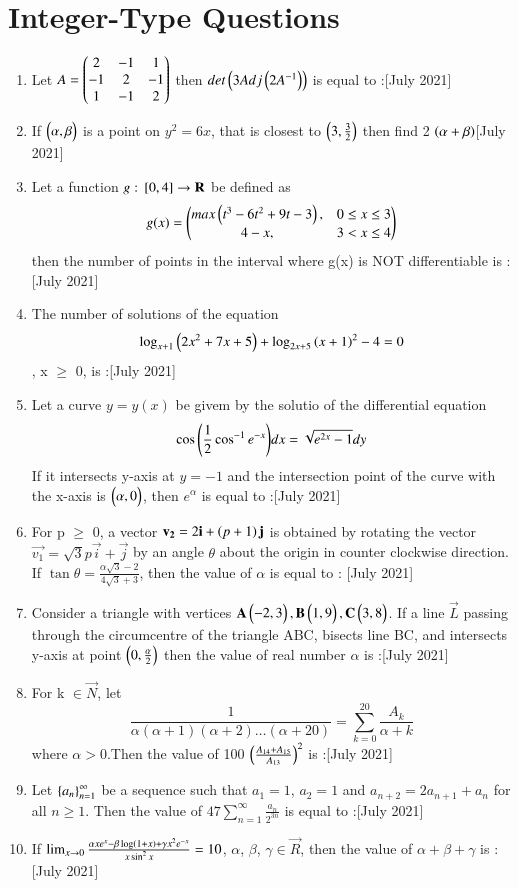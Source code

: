 \documentclass[journal,12pt,onecolumn]{IEEEtran}
\theoremstyle{remark}
\begin{document}
\section{Integer-Type Questions}
\begin{enumerate}
	\item Let $ A = \begin{pmatrix}2 & -1 & 1 \\ -1 & 2 & -1 \\ 1 & -1 & 2\end{pmatrix}$ then $det\left(3Adj\left(2A^{-1}\right)\right)$ is equal to :\hfill{[July 2021]}
	\item If $\begin{pmatrix}\alpha , \beta\end{pmatrix}$ is a point on $y^2=6x$, that is closest to $\begin{pmatrix}3,\frac{3}{2}\end{pmatrix}$ then find 2 $ \left(\alpha+\beta\right) $\hfill{[July 2021]}

	\item Let a function  $g : {}\left[0,4\right] \rightarrow \mathbf{R}$ be defined as
		$$ g(x) = \begin{pmatrix} max\left(t^3-6t^2+9t-3\right), & 0 \leq x \leq 3 \\
		                  4 - x, & 3 < x \leq 4 \end{pmatrix} $$
			then the number of points in the interval  where g(x) is NOT differentiable is :\hfill{[July 2021]}
		\item The number of solutions of the equation $$\log_{x+1}{\left(2x^2+7x+5\right)} + \log_{2x+5}{\left(x+1\right)^2} - 4 = 0$$, x $\geq$ 0, is :\hfill{[July 2021]}

	\item Let a curve $ y = y(x)$ be givem by the solutio of the differential equation $$\cos{\ensuremath{\left(\frac{1}{2}\cos^{-1}{e^{-x}}\right)}} dx = \sqrt{e^{2x} - 1} dy $$If it intersects y-axis at $y=-1$ and the intersection point of the curve with the x-axis is $\begin{pmatrix}\alpha , 0\end{pmatrix}$, then $e^{\alpha}$ is equal to :\hfill{[July 2021]}
	\item For p $\geq$ 0, a vector $\mathbf{v_2} = 2\mathbf{i} + \left(p+1\right)\mathbf{j}$ is obtained by rotating the vector $\vec{v_1} = \sqrt{3}p\vec{i} + \vec{j}$ by an angle $\theta$ about the origin in counter clockwise direction. If $\tan{\theta} = \frac{\alpha\sqrt{3} - 2}{4\sqrt{3} + 3}$, then the value of $\alpha$ is equal to : \hfill{[July 2021]}
	\item Consider a triangle with vertices $\mathbf{A} \begin{pmatrix}-2,3\end{pmatrix}, \mathbf{B} \begin{pmatrix}1,9\end{pmatrix}, \mathbf{C} \begin{pmatrix}3,8\end{pmatrix}$. If a line $\vec{L}$ passing through the circumcentre of the triangle ABC, bisects line BC, and intersects y-axis at point $\begin{pmatrix}0,\frac{\alpha}{2}\end{pmatrix}$ then the value of real number $\alpha$ is :\hfill{[July 2021]}
	\item For k $\in \vec{N}$, let $$ \frac{1}{\alpha(\alpha +1)(\alpha +2)\dots(\alpha +20)} = \sum_{k=0}^{20} \frac{A_k}{\alpha + k} $$ where $\alpha>0$.Then the value of 100 $\left(\frac{A_{14} + A_{15}}{A_{13}}\right)^2 $ is :\hfill{[July 2021]}
	\item Let $\left\{a_{n}\right\}_{n=1}^{\infty}$ be a sequence such that $a_1 = 1$, $a_2 = 1$ and $a_{n+2} = 2a_{n+1} + a_{n}$ for all $n \geq 1$. Then the value of $47 \sum_{n=1}^{\infty} \frac{a_{n}}{2^{3n}}$ is equal to :\hfill{[July 2021]}
	\item If $\lim_{x \to 0} \frac{\alpha xe^{x} - \beta \log\left(1+x\right) + \gamma x^2e^{-x}}{x \sin^{2}{x}} = 10 $, $\alpha$, $\beta$, $\gamma \in \vec{R}$, then the value of $\alpha + \beta + \gamma$ is : \hfill{[July 2021]}
\end{enumerate}
\end{document}
